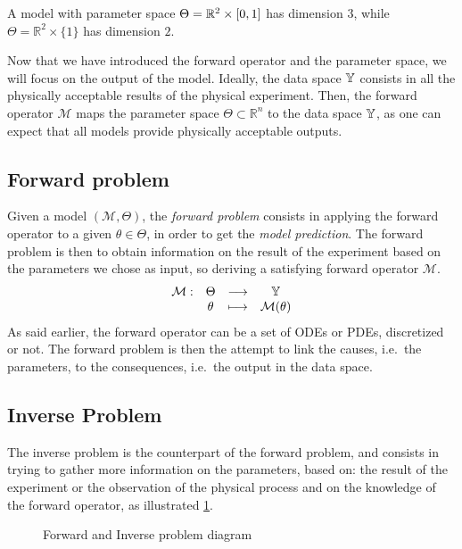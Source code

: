 \documentclass[../../Main_ManuscritThese.tex]{subfiles}
\newcommand\imgpath{/home/victor/acadwriting/Manuscrit/Text/Chapter2/img/}
\begin{document}
\begin{example}
  A model with parameter space $\Theta = \mathbb{R}^2\times \interval{0}{1}$ has dimension $3$, while $\Theta = \mathbb{R}^2 \times \{1\}$ has dimension $2$.
\end{example}
 Now that we have introduced the forward operator and the parameter space, we will focus on the output of the model.
Ideally, the data space $\mathbb{Y}$ consists in all the physically acceptable results of the physical experiment.
Then, the forward operator $\mathcal{M}$ maps the parameter space $\Theta \subset \mathbb{R}^{n}$ to the data space $\mathbb{Y}$, as one can expect that all models provide physically acceptable outputs.

\subsection{Forward problem}
Given a model $(\mathcal{M}, \Theta)$, the \emph{forward problem} consists in applying the forward operator to a given $\theta \in \Theta$, in order to get the \emph{model prediction}. The forward problem is then to obtain information on the result of the experiment based on the parameters we chose as input, so deriving a satisfying forward operator $\mathcal{M}$.
\begin{equation}
  \begin{array}{cccc}
    \mathcal{M}:& \Theta &\longrightarrow & \mathbb{Y} \\
                & \theta &\longmapsto     & \mathcal{M}(\theta)
  \end{array}
\end{equation}
As said earlier, the forward operator can be a set of ODEs or PDEs, discretized or not. The forward problem is then the attempt to link the causes, i.e.\ the parameters, to the consequences, i.e.\ the output in the data space.

\subsection{Inverse Problem}
The inverse problem is the counterpart of the forward problem, and consists in trying to gather more information on the parameters, based on: the result of the experiment or the observation of the physical process and on the knowledge of the forward operator, as illustrated \cref{fig:inv_problem_pple}.

\begin{figure}[ht]
  \centering
  
  \caption{Forward and Inverse problem diagram}
  \label{fig:inv_problem_pple}
\end{figure}
\end{document}
